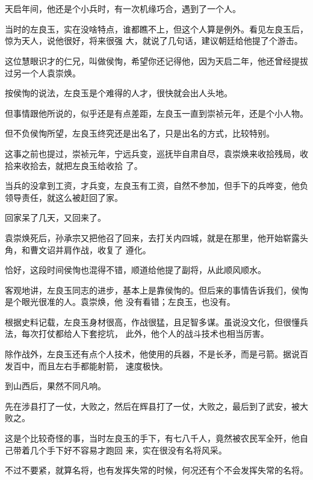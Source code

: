 \documentclass[11pt,a4paper,onecolumn]{article}
\begin{document}
\section[\thesection]{}

天启年间，他还是个小兵时，有一次机缘巧合，遇到了一个人。

当时的左良玉，实在没啥特点，谁都瞧不上，但这个人算是例外。看见左良玉后，惊为天人，说他很好，将来很强
大，就说了几句话，建议朝廷给他提了个游击。

这位慧眼识才的仁兄，叫做侯恂，希望你还记得他，因为天启二年，他还曾经提拔过另一个人\myrule 袁崇焕。

按侯恂的说法，左良玉是个难得的人才，很快就会出人头地。

但事情跟他所说的，似乎还是有点差距，左良玉一直到崇祯元年，还是个小人物。

但不负侯恂所望，左良玉终究还是出名了，只是出名的方式，比较特别。

这事之前也提过，崇祯元年，宁远兵变，巡抚毕自肃自尽，袁崇焕来收拾残局，收拾来收拾去，就把左良玉给收拾
了。

当兵的没拿到工资，才兵变，左良玉有工资，自然不参加，但手下的兵哗变，他负领导责任，就这么被赶回了家。

回家呆了几天，又回来了。

袁崇焕死后，孙承宗又把他召了回来，去打关内四城，就是在那里，他开始崭露头角，和曹文诏并肩作战，收复了
遵化。

恰好，这段时间侯恂也混得不错，顺道给他提了副将，从此顺风顺水。

客观地讲，左良玉同志的进步，基本上是靠侯恂的。但后来的事情告诉我们，侯恂是个眼光很准的人。袁崇焕，他
没有看错；左良玉，也没有。

根据史料记载，左良玉身材很高，作战很猛，且足智多谋。虽说没文化，但很懂兵法，每次打仗都给人下套挖坑，
此外，他个人的战斗技术也相当厉害。

除作战外，左良玉还有点个人技术，他使用的兵器，不是长矛，而是弓箭。据说百发百中，而且左右手都能射箭，
速度极快。

到山西后，果然不同凡响。

先在涉县打了一仗，大败之，然后在辉县打了一仗，大败之，最后到了武安，被大败之。

这是个比较奇怪的事，当时左良玉的手下，有七八千人，竟然被农民军全歼，他自己带着几个手下好不容易才跑回
来，实在很没有名将风采。

不过不要紧，就算名将，也有发挥失常的时候，何况还有个不会发挥失常的名将。

\section[\thesection]{}
\end{document}
